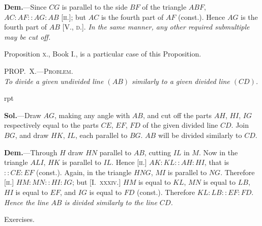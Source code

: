 \documentclass[oneside]{book}
\newcommand\myprop[2]{
\bigskip\Needspace*{4\baselineskip}\begin{center}\textsc{#1}\\\medskip\emph{#2}\par\end{center}
}
\newcommand\exhead[1]{
\Needspace*{5\baselineskip}\begin{center}
\textsf{#1}
\end{center}
}
\newcommand\imgflow[3]{
\setcounter{wrapwidth}{#1}
\begin{wrapfigure}[#2]{r}{\value{wrapwidth}pt}
\begin{center}
\vspace{-0.3in}
\end{center}
\end{wrapfigure}
}
\begin{document}
\textbf{Dem.}---Since $CG$ is parallel to the side $BF$ of the
triangle $ABF$, $AC : AF :: AG
: AB$ [\textsc{ii.}]; but $AC$ is the fourth
part of $AF$ (const.). Hence $AG$
is the fourth part of $AB$ [V., \textsc{d.}].
\textit{In the same manner, any other required
submultiple may be cut off.}

Proposition \textsc{x.}, Book I., is a particular case of this
Proposition.

\myprop{PROP\@.~X.---Problem.}{To divide a given undivided line $(AB)$ similarly to a given
divided line $(CD)$.}

\imgflow{140}{8}{f178}

\textbf{Sol.}---Draw $AG$, making any angle with $AB$, and
cut off the parts $AH$, $HI$, $IG$
respectively equal to the
parts $CE$, $EF$, $FD$ of the
given divided line $CD$. Join
$BG$, and draw $HK$, $IL$, each
parallel to $BG$. $AB$ will be
divided similarly to $CD$.

\textbf{Dem.}---Through $H$ draw
$HN$ parallel to $AB$, cutting $IL$ in $M$. Now in the
triangle $ALI$, $HK$ is parallel to $IL$. Hence [\textsc{ii.}]
$AK : KL :: AH : HI$, that is $:: CE : EF$ (const.).
Again, in the triangle $HNG$, $MI$ is parallel to $NG$.
Therefore [\textsc{ii.}] $HM : MN :: HI : IG$; but [I.~\textsc{xxxiv.}]
$HM$ is equal to $KL$, $MN$ is equal to $LB$, $HI$ is equal
to $EF$, and $IG$ is equal to $FD$ (const.). Therefore
$KL : LB :: EF : FD$. \textit{Hence the line $AB$ is divided
similarly to the line $CD$.}

\exhead{Exercises.}
\end{document}
